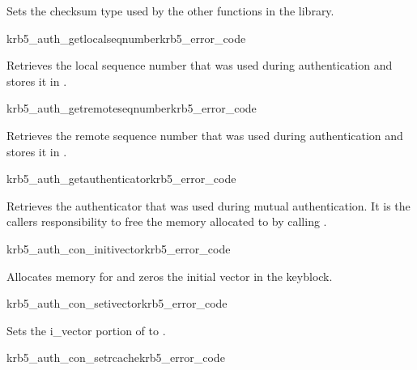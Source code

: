 Sets the checksum type used by the other functions in the library. 

\begin{funcdecl}{krb5_auth_getlocalseqnumber}{krb5_error_code}{\funcinout}
\funcin
{}
\end{funcdecl}

Retrieves the local sequence number that was used during authentication
and stores it in .

\begin{funcdecl}{krb5_auth_getremoteseqnumber}{krb5_error_code}{\funcinout}
\funcin
{}
\end{funcdecl}

Retrieves the remote sequence number that was used during authentication
and stores it in .

\begin{funcdecl}{krb5_auth_getauthenticator}{krb5_error_code}{\funcinout}
\funcout
{}
\end{funcdecl}

Retrieves the authenticator that was used during mutual
authentication. It is the callers responsibility to free the memory
allocated to  by calling
. 

\begin{funcdecl}{krb5_auth_con_initivector}{krb5_error_code}{\funcinout}
\end{funcdecl}

Allocates memory for and zeros the initial vector in the
 keyblock.

\begin{funcdecl}{krb5_auth_con_setivector}{krb5_error_code}{\funcinout}
\funcin
{}
\end{funcdecl}

Sets the i_vector portion of  to
. 

\begin{funcdecl}{krb5_auth_con_setrcache}{krb5_error_code}{\funcinout}
\funcin
{}
\end{funcdecl}

